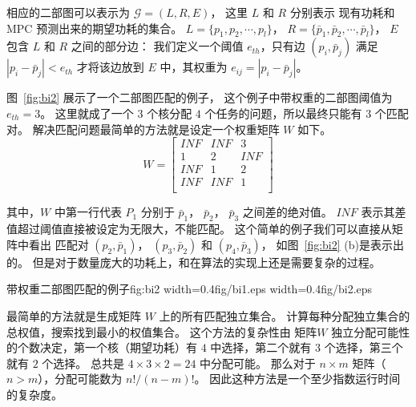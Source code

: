 相应的二部图可以表示为 $\mathcal{G} = (L, R, E)$，
这里 $L$ 和 $R$ 分别表示 现有功耗和 MPC 预测出来的期望功耗的集合。
$L = \{p_1, p_2, \cdots, p_l\}$， $R = \{\bar{p}_1,
\bar{p}_2, \cdots, \bar{p}_l\}$，
 $E$ 包含 $L$ 和 $R$ 之间的部分边：
 我们定义一个阈值 $e_{th}$，只有边 $(p_i, \bar{p}_j)$ 满足 $|p_i-\bar{p}_j|<e_{th}$ 才将该边放到 $E$ 中，其权重为 $e_{ij} = |p_i-\bar{p}_j|$。
 
 图~\ref{fig:bi2} 展示了一个二部图匹配的例子， 这个例子中带权重的二部图阈值为 $e_{th}=3$。
 这里就成了一个 $3$ 个核分配 $4 $ 个任务的问题，所以最终只能有 $3$ 个匹配对。
 解决匹配问题最简单的方法就是设定一个权重矩阵 $W$ 如下。
 \begin{equation}
W= 
\left[
\begin{array}{ccc}
INF & INF & 3   \\
1   &  2  & INF  \\
INF &  1  & 2   \\
INF & INF & 1    \\
\end{array}
\right]
\end{equation}

其中，$W$ 中第一行代表 $P_1$ 分别于 $\bar{p}_1$， $\bar{p}_2$， $\bar{p}_3$ 之间差的绝对值。  
$INF $ 表示其差值超过阈值直接被设定为无限大，不能匹配。
这个简单的例子我们可以直接从矩阵中看出 匹配对 $(p_2, \bar{p}_1)$， $(p_3, \bar{p}_2)$ 和 $(p_4, \bar{p}_3)$， 如图~\ref{fig:bi2} (b)是表示出的。
但是对于数量庞大的功耗上，和在算法的实现上还是需要复杂的过程。

 \begin{pics}[H]{带权重二部图匹配的例子}{fig:bi2}
   {width=0.4\columnwidth}{fig/bi1.eps}
   {width=0.4\columnwidth}{fig/bi2.eps}
 \end{pics}

最简单的方法就是生成矩阵 $W$ 上的所有匹配独立集合。 计算每种分配独立集合的总权值，搜索找到最小的权值集合。
这个方法的复杂性由 矩阵$W$ 独立分配可能性的个数决定，第一个核（期望功耗）有 $4$ 中选择，第二个就有 $3$ 个选择，第三个就有 $2$ 个选择。
总共是  $4 \times 3 \times 2 = 24$ 中分配可能。 那么对于 $ n\times m$ 矩阵（$n > m$），分配可能数为 $n!/(n-m)!$。
因此这种方法是一个至少指数运行时间的复杂度。

